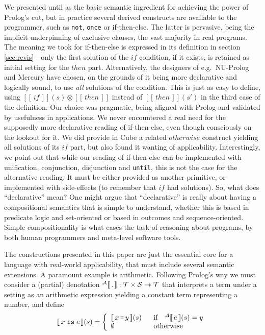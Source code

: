 \documentclass{tlp}
\newcommand\caseif[1]{\left\{\begin{array}{ll}#1\end{array}\right.}
\newcommand\cond{&\quad\!\!\mbox{if}\quad}
\newcommand\other{&\quad\!\!\mbox{otherwise}}
\def\imp{\rightarrow}
\def\S{{\cal S}}               \def\T{{\cal T}}               \def\V{{\cal V}}               \def\dlt{\triangle}
\def\denotstart{[\![\,}
\def\denotend{\,]\!]}
\def\denot#1{\denotstart#1\denotend}
\newcommand{\cube}{\textsf{Cube}}
\def\A{\mathcal A}
\def\obeq{\,\texttt{=}\,}
\def\mite{\textsf{if-then-else}}
\def\mtt#1{\mbox{\tt #1}}
\def\ff{\emptyset}
\def\sprod{\otimes}
\begin{document}
We presented \textsf{until} as the basic semantic ingredient for achieving the
power of Prolog's cut, but in practice several derived constructs are available
to the programmer, such as {\tt not}, {\tt once} or \mite. The latter is
pervasive, being the implicit underpinning of exclusive clauses, the vast
majority in real programs. The meaning we took for \mite{} is expressed in its
definition in section \ref{sec:revis}---only the first solution of the
$\mathit{if}$ condition, if it exists, is retained as initial setting for the
$\mathit{then}$ part. Alternatively, the designers of e.g.\ NU-Prolog
\cite{NUProlog} and Mercury \cite{Mercury} have chosen, on the grounds of it
being more declarative and logically sound, to use \emph{all} solutions of the
condition. This is just as easy to define, using
$\denot{\mathit{if}}(s)\sprod\denot{\mathit{then}}$ instead of
$\denot{\mathit{then}}(s')$ in the third case of the definition.  Our choice was
pragmatic, being aligned with Prolog and validated by usefulness in
applications. We never encountered a real need for the supposedly more
declarative reading of \mite, even though consciously on the lookout for it. We
did provide in \cube{} a related $\mathit{otherwise}$ construct yielding all
solutions of its $\mathit{if}$ part, but also found it wanting of applicability.
Interestingly, we point out that while our reading of \mite{} can be implemented
with unification, conjunction, disjunction and \texttt{until}, this is not the
case for the alternative reading. It must be either provided as another
primitive, or implemented with side-effects (to remember that $\mathit{if}$ had
solutions).  So, what does ``declarative'' mean? One might argue that
``declarative'' is really about having a compositional semantics that is simple
to understand, whether this is based in predicate logic and set-oriented or based
in outcomes and sequence-oriented.  Simple compositionality is what eases the
task of reasoning about programs, by both human programmers and meta-level
software tools.

The constructions presented in this paper are just the essential core for
a language with real-world applicability, that must include several
semantic extensions. A paramount example is arithmetic. Following
Prolog's way we must consider a (partial) denotation $^\A\denot
.:\T\times\S\imp\T$ that interprets a term under a setting as an arithmetic
expression yielding a constant term representing a number, and define
\[\denot{x\;\mtt{is}\;e}(s)=\caseif{
\denot{x\obeq y}(s)\cond{^\A\denot e(s)=y}\\
\ff\other
}\]
\end{document}
